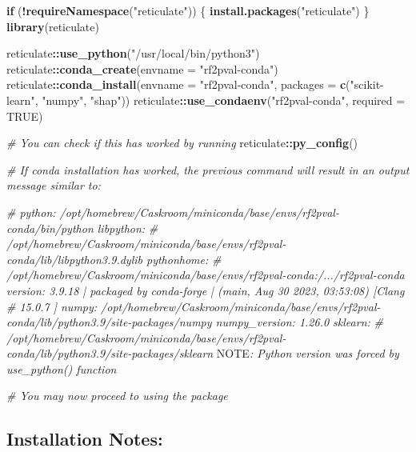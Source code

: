 \documentclass[
]{article}
\newenvironment{Shaded}{\begin{snugshade}}{\end{snugshade}}
\newcommand{\AlertTok}[1]{\textcolor[rgb]{0.94,0.16,0.16}{#1}}
\newcommand{\AttributeTok}[1]{\textcolor[rgb]{0.13,0.29,0.53}{#1}}
\newcommand{\CommentTok}[1]{\textcolor[rgb]{0.56,0.35,0.01}{\textit{#1}}}
\newcommand{\ConstantTok}[1]{\textcolor[rgb]{0.56,0.35,0.01}{#1}}
\newcommand{\ControlFlowTok}[1]{\textcolor[rgb]{0.13,0.29,0.53}{\textbf{#1}}}
\newcommand{\FunctionTok}[1]{\textcolor[rgb]{0.13,0.29,0.53}{\textbf{#1}}}
\newcommand{\NormalTok}[1]{#1}
\newcommand{\SpecialCharTok}[1]{\textcolor[rgb]{0.81,0.36,0.00}{\textbf{#1}}}
\newcommand{\StringTok}[1]{\textcolor[rgb]{0.31,0.60,0.02}{#1}}
\begin{document}
\begin{Shaded}
\begin{Highlighting}[]
\ControlFlowTok{if}\NormalTok{ (}\SpecialCharTok{!}\FunctionTok{requireNamespace}\NormalTok{(}\StringTok{"reticulate"}\NormalTok{)) \{}
    \FunctionTok{install.packages}\NormalTok{(}\StringTok{"reticulate"}\NormalTok{)}
\NormalTok{\}}
\FunctionTok{library}\NormalTok{(reticulate)}

\NormalTok{reticulate}\SpecialCharTok{::}\FunctionTok{use\_python}\NormalTok{(}\StringTok{"/usr/local/bin/python3"}\NormalTok{)}
\NormalTok{reticulate}\SpecialCharTok{::}\FunctionTok{conda\_create}\NormalTok{(}\AttributeTok{envname =} \StringTok{"rf2pval{-}conda"}\NormalTok{)}
\NormalTok{reticulate}\SpecialCharTok{::}\FunctionTok{conda\_install}\NormalTok{(}\AttributeTok{envname =} \StringTok{"rf2pval{-}conda"}\NormalTok{, }\AttributeTok{packages =} \FunctionTok{c}\NormalTok{(}\StringTok{"scikit{-}learn"}\NormalTok{, }\StringTok{"numpy"}\NormalTok{, }\StringTok{"shap"}\NormalTok{))}
\NormalTok{reticulate}\SpecialCharTok{::}\FunctionTok{use\_condaenv}\NormalTok{(}\StringTok{"rf2pval{-}conda"}\NormalTok{, }\AttributeTok{required =} \ConstantTok{TRUE}\NormalTok{)}

\CommentTok{\# You can check if this has worked by running}
\NormalTok{reticulate}\SpecialCharTok{::}\FunctionTok{py\_config}\NormalTok{()}

\CommentTok{\# If conda installation has worked, the previous command will result in an output message similar to:}

\CommentTok{\# python: /opt/homebrew/Caskroom/miniconda/base/envs/rf2pval{-}conda/bin/python libpython:}
\CommentTok{\# /opt/homebrew/Caskroom/miniconda/base/envs/rf2pval{-}conda/lib/libpython3.9.dylib pythonhome:}
\CommentTok{\# /opt/homebrew/Caskroom/miniconda/base/envs/rf2pval{-}conda:/.../rf2pval{-}conda version: 3.9.18 | packaged by conda{-}forge | (main, Aug 30 2023, 03:53:08) [Clang}
\CommentTok{\# 15.0.7 ] numpy: /opt/homebrew/Caskroom/miniconda/base/envs/rf2pval{-}conda/lib/python3.9/site{-}packages/numpy numpy\_version: 1.26.0 sklearn:}
\CommentTok{\# /opt/homebrew/Caskroom/miniconda/base/envs/rf2pval{-}conda/lib/python3.9/site{-}packages/sklearn }\AlertTok{NOTE}\CommentTok{: Python version was forced by use\_python() function}

\CommentTok{\# You may now proceed to using the package}
\end{Highlighting}
\end{Shaded}

\hypertarget{installation-notes}{%
\subsection{Installation Notes:}\label{installation-notes}}
\end{document}
